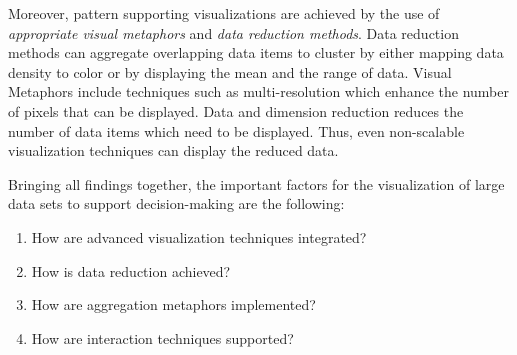 Moreover, pattern supporting visualizations are achieved by the use of \textit{appropriate visual metaphors} and \textit{data reduction methods}. Data reduction methods can aggregate overlapping data items to cluster by either mapping data density to color or by displaying the mean and the range of data. Visual Metaphors include techniques such as multi-resolution which enhance the number of pixels that can be displayed. Data and dimension reduction reduces the number of data items which need to be displayed. Thus, even non-scalable visualization techniques can display the reduced data. 
\par

Bringing all findings together, the important factors for the visualization of large data sets to support decision-making are the following: 
\begin{enumerate}[noitemsep]
\item How are advanced visualization techniques integrated? 
\item How is data reduction achieved? 
\item How are aggregation metaphors implemented? 
\item How are interaction techniques supported?
\end{enumerate}

